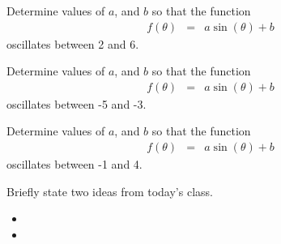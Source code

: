 \begin{problem}
\begin{subproblem}
    \clearpage

  \item Determine values of $a$, and $b$ so that the function
    \begin{eqnarray*}
      f(\theta) & = & a\sin(\theta)+b
    \end{eqnarray*}
    oscillates between 2 and 6.
    \vfill

  \item Determine values of $a$, and $b$ so that the function
    \begin{eqnarray*}
      f(\theta) & = & a\sin(\theta)+b
    \end{eqnarray*}
    oscillates between -5 and -3.
    \vfill


  \item Determine values of $a$, and $b$ so that the function
    \begin{eqnarray*}
      f(\theta) & = & a\sin(\theta)+b
    \end{eqnarray*}
    oscillates between -1 and 4.
    \vfill
  \end{subproblem}

\end{problem}

\postClass

\begin{problem}
\item Briefly state two ideas from today's class.
  \begin{itemize}
  \item
  \item
  \end{itemize}
\item
  \begin{subproblem}
    \item
  \end{subproblem}
\end{problem}


